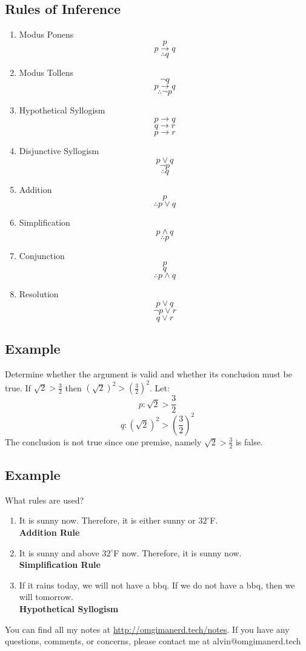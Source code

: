 \documentclass[letterpaper, 12pt]{math}
\begin{document}
\subsection*{Rules of Inference}
\begin{enumerate}
  \item Modus Ponens
    \[ p \]
    \[ p \to q \]
    \[ \therefore q\]
  \item Modus Tollens
    \[ \neg{q} \]
    \[ p \to q \]
    \[ \therefore \neg{p} \]
  \item Hypothetical Syllogism
    \[ p \to q \]
    \[ q \to r \]
    \[ p \to r \]
  \item Disjunctive Syllogism
    \[ p \vee q \]
    \[ \neg{p} \]
    \[ \therefore q \]
  \item Addition
    \[ p \]
    \[ \therefore p \vee q \]
  \item Simplification
    \[ p \wedge q \]
    \[ \therefore p \]
  \item Conjunction
    \[ p \]
    \[ q \]
    \[ \therefore p \wedge q \]
  \item Resolution
    \[ p \vee q \]
    \[ \neg{p} \vee r \]
    \[ q \vee r \]
\end{enumerate}

\subsection*{Example}
Determine whether the argument is valid and whether its conclusion must be true.
If \( \sqrt{2} > \frac{3}{2} \) then \( (\sqrt{2})^{2} > (\frac{3}{2})^{2} \).
Let:
\[ p: \sqrt{2} > \frac{3}{2} \]
\[ q: (\sqrt{2})^{2} > (\frac{3}{2})^{2} \]
The conclusion is not true since one premise, namely
\( \sqrt{2} > \frac{3}{2} \) is false.

\subsection*{Example}
What rules are used?
\begin{enumerate}
  \item It is sunny now. Therefore, it is either sunny or \( 32^{\circ} \)F. \\
    \textbf{Addition Rule}
  \item It is sunny and above \( 32^{\circ} \)F now. Therefore, it is sunny
    now. \\
    \textbf{Simplification Rule}
  \item If it rains today, we will not have a bbq. If we do not have a bbq,
    then we will tomorrow. \\
    \textbf{Hypothetical Syllogism}
\end{enumerate}

\begin{center}
  You can find all my notes at \url{http://omgimanerd.tech/notes}. If you have
  any questions, comments, or concerns, please contact me at
  alvin@omgimanerd.tech
\end{center}
\end{document}
